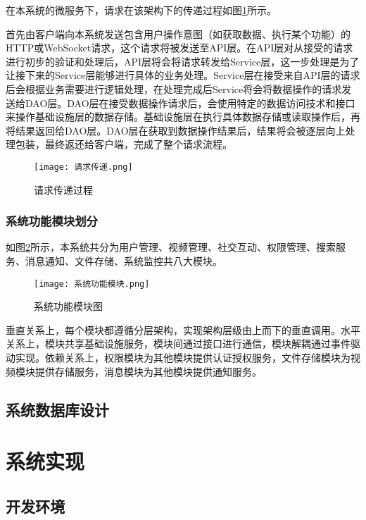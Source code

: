 在本系统的微服务下，请求在该架构下的传递过程如图\ref{请求传递过程}所示。

首先由客户端向本系统发送包含用户操作意图（如获取数据、执行某个功能）的HTTP或WebSocket请求，这个请求将被发送至API层。在API层对从接受的请求进行初步的验证和处理后，API层将会将请求转发给Service层，这一步处理是为了让接下来的Service层能够进行具体的业务处理。Service层在接受来自API层的请求后会根据业务需要进行逻辑处理，在处理完成后Service将会将数据操作的请求发送给DAO层。DAO层在接受数据操作请求后，会使用特定的数据访问技术和接口来操作基础设施层的数据存储。基础设施层在执行具体数据存储或读取操作后，再将结果返回给DAO层。DAO层在获取到数据操作结果后，结果将会被逐层向上处理包装，最终返还给客户端，完成了整个请求流程。
\begin{figure}[hbt]
    \centering
    \texttt{[image: 请求传递.png]}
    \caption{请求传递过程}
    \label{请求传递过程}
\end{figure}

\subsubsection{系统功能模块划分}

如图\ref{系统功能模块图}所示，本系统共分为用户管理、视频管理、社交互动、权限管理、搜索服务、消息通知、文件存储、系统监控共八大模块。
\begin{figure}[hbt]
    \centering
    \texttt{[image: 系统功能模块.png]}
    \caption{系统功能模块图}
    \label{系统功能模块图}
\end{figure}

垂直关系上，每个模块都遵循分层架构，实现架构层级由上而下的垂直调用。水平关系上，模块共享基础设施服务，模块间通过接口进行通信，模块解耦通过事件驱动实现。依赖关系上，权限模块为其他模块提供认证授权服务，文件存储模块为视频模块提供存储服务，消息模块为其他模块提供通知服务。

\subsection{系统数据库设计}

\newpage

\section{系统实现}
\subsection{开发环境}
